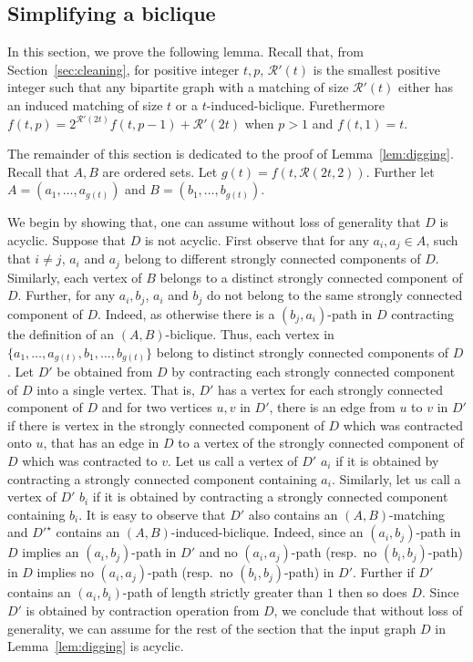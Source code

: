 \subsection{Simplifying a biclique}\label{sec:simplifyingbiclique}
In this section, we prove the following lemma. Recall that, from Section~\ref{sec:cleaning}, for positive integer $t,p$, $\mathcal{R}'(t)$ is the smallest positive integer such that any bipartite graph with a matching of size $\mathcal{R}'(t)$ either has an induced matching of size $t$ or a $t$-induced-biclique.
Furethermore $f(t,p) = 2^{\mathcal{R}'(2t)} f(t,p-1) + \mathcal{R}'(2t)$ 
when $p>1$ and $f(t,1)=t$. 

\digging*

The remainder of this section is dedicated to the proof of Lemma~\ref{lem:digging}. Recall that $A,B$ are ordered sets. Let $g(t) = f(t, \mathcal{R}(2t,2))$.
Further let $A=(a_1, \ldots, a_{g(t)})$ and $B=(b_1, \ldots, b_{g(t)})$.  

We begin by showing that, one can assume without loss of generality that $D$ is acyclic.
Suppose that $D$ is not acyclic. First observe that for any $a_i,a_j \in A$, such that $i \neq j$, $a_i$ and $a_j$ belong to different strongly connected components of $D$. Similarly, each vertex of $B$ belongs to a distinct strongly connected component of $D$. Further, for any $a_i,b_j$, $a_i$ and $b_j$ do not belong to the same strongly connected component of $D$. Indeed, as otherwise there is a $(b_j,a_i)$-path in $D$ contracting the definition of an $(A,B)$-biclique. Thus, each vertex in $\{a_1, \ldots, a_{g(t)}, b_1 , \ldots, b_{g(t)}\}$ belong to distinct strongly connected components of $D$.
Let $D'$ be obtained from $D$ by contracting each strongly connected component of $D$ into a single vertex. That is, $D'$ has a vertex for each strongly connected component of $D$ and for two vertices $u,v$ in $D'$, there is an edge from $u$ to $v$ in $D'$ if there is vertex in the strongly connected component of $D$ which was contracted onto $u$, that has an edge in $D$ to a vertex of the strongly connected component of $D$ which was contracted to $v$. Let us call a vertex of $D'$ $a_i$ if it is obtained by contracting a strongly connected component containing $a_i$. Similarly, let us call a vertex of $D'$ $b_i$ if it is obtained by contracting a strongly connected component containing $b_i$. It is easy to observe that $D'$ also contains an $(A,B)$-matching and $D'^{\star}$ contains an $(A,B)$-induced-biclique. Indeed, since an $(a_i,b_j)$-path in $D$ implies an $(a_i,b_j)$-path in $D'$ and no $(a_i,a_j)$-path (resp.~no $(b_i,b_j)$-path) in $D$ implies no $(a_i,a_j)$-path (resp.~no $(b_i,b_j)$-path) in $D'$. Further if $D'$ contains an $(a_i,b_i)$-path of length strictly greater than $1$ then so does $D$. Since $D'$ is obtained by contraction operation from $D$, we conclude that without loss of generality, we can assume for the rest of the section that the input graph $D$ in Lemma~\ref{lem:digging} is acyclic.

